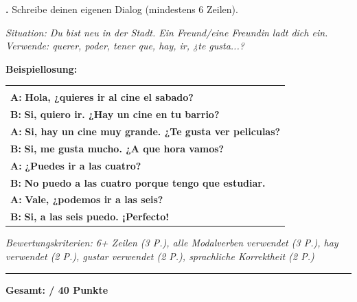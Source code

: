 \documentclass[11pt,a4paper]{article}
\newcommand{\luecke}[1]{\underline{\hspace{#1}}}
\newcommand{\lsg}[1]{\textcolor{loesung}{\textbf{#1}}}
\newcommand{\punktebox}[1]{\hfill\fbox{\small \_\_/#1}}
\newcounter{aufgabe}
\newcommand{\aufgabe}[2]{%
    \stepcounter{aufgabe}%
    \vspace{0.8em}%
    \noindent\textbf{\theaufgabe.} #1 \punktebox{#2}%
    \vspace{0.3em}%
}
\begin{document}
\vspace{0.8em}

\aufgabe{Schreibe deinen eigenen Dialog (mindestens 6 Zeilen).}{12}

\vspace{0.2em}
\noindent\textit{Situation: Du bist neu in der Stadt. Ein Freund/eine Freundin ladt dich ein.}\\
\textit{Verwende: querer, poder, tener que, hay, ir, ¿te gusta...?}

\vspace{0.3em}
\noindent\textcolor{loesung}{\textbf{Beispiellosung:}}

\vspace{0.2em}
\begin{tabularx}{\textwidth}{@{}|X|@{}}
\hline
\\[0.2em]
\textbf{A:} \lsg{Hola, ¿quieres ir al cine el sabado?} \\[0.5em]
\textbf{B:} \lsg{Si, quiero ir. ¿Hay un cine en tu barrio?} \\[0.5em]
\textbf{A:} \lsg{Si, hay un cine muy grande. ¿Te gusta ver peliculas?} \\[0.5em]
\textbf{B:} \lsg{Si, me gusta mucho. ¿A que hora vamos?} \\[0.5em]
\textbf{A:} \lsg{¿Puedes ir a las cuatro?} \\[0.5em]
\textbf{B:} \lsg{No puedo a las cuatro porque tengo que estudiar.} \\[0.5em]
\textbf{A:} \lsg{Vale, ¿podemos ir a las seis?} \\[0.5em]
\textbf{B:} \lsg{Si, a las seis puedo. ¡Perfecto!} \\[0.2em]
\hline
\end{tabularx}

\vspace{0.3em}
\noindent\textcolor{grau}{\textit{Bewertungskriterien: 6+ Zeilen (3 P.), alle Modalverben verwendet (3 P.), hay verwendet (2 P.), gustar verwendet (2 P.), sprachliche Korrektheit (2 P.)}}

\vspace{1em}
\hrule
\vspace{0.3em}
\begin{flushright}
\textbf{Gesamt: \luecke{1cm} / 40 Punkte}
\end{flushright}
\end{document}
